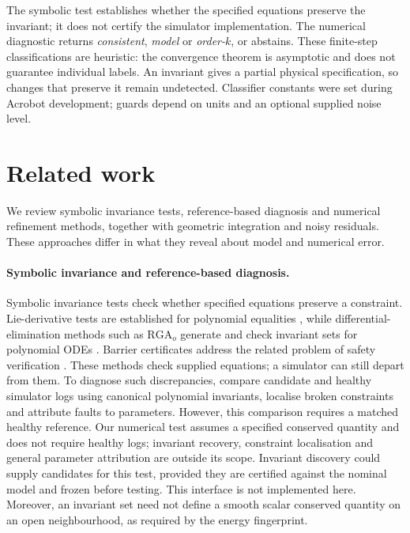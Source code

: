 \documentclass[10pt]{article}
\theoremstyle{definition}
\begin{document}
The symbolic test establishes whether the specified equations preserve the
invariant; it does not certify the simulator implementation. The numerical
diagnostic returns \emph{consistent}, \emph{model} or \emph{order-$k$}, or
abstains. These finite-step classifications are heuristic: the convergence
theorem is asymptotic and does not guarantee individual labels. An invariant
gives a partial physical specification, so changes that preserve it remain
undetected. Classifier constants were set during Acrobot development; guards
depend on units and an optional supplied noise level.

\section{Related work}\label{sec:related}

We review symbolic invariance tests, reference-based diagnosis and numerical
refinement methods, together with geometric integration and noisy residuals.
These approaches differ in what they reveal about model and numerical error.

\paragraph{Symbolic invariance and reference-based diagnosis.}
Symbolic invariance tests check whether specified equations preserve a
constraint. Lie-derivative tests are established for polynomial equalities
\citep{ghorbal2014}, while differential-elimination methods such as
$\mathrm{RGA}_o$ generate and check invariant sets for polynomial ODEs
\citep{simmons2026}. Barrier certificates address the related problem of
safety verification \citep{prajna2004}. These methods check supplied equations; a simulator can still depart from them. To diagnose such discrepancies, \citet{gebrekidan2026diagnosing}
compare candidate and healthy simulator logs using canonical polynomial
invariants, localise broken constraints and attribute faults to parameters.
However, this comparison requires a matched healthy reference. Our numerical
test assumes a specified conserved quantity and does not require healthy
logs; invariant recovery, constraint localisation and general parameter
attribution are outside its scope. Invariant discovery could supply
candidates for this test, provided they are certified against the nominal
model and frozen before testing. This interface is not implemented here.
Moreover, an invariant set need not define a smooth scalar conserved quantity
on an open neighbourhood, as required by the energy fingerprint.
\end{document}
